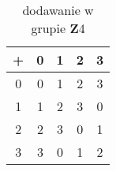 \begin{table}[h]
\centering
\begin{tabular}{|c||c|c|c|c|}
\hline
+  & \textbf{0} & \textbf{1} & \textbf{2} & \textbf{3}   \\ \hline \hline
0  &    0       &     1      &      2     &     3        \\ \hline 
1  &    1       &     2      &      3     &     0        \\ \hline
2  &    2       &     3      &      0     &     1        \\ \hline
3  &    3       &     0      &      1     &     2        \\ \hline
\end{tabular}
\caption{dodawanie w grupie {\bf Z}\tiny 4}
\label{tab Z4}
\end{table}